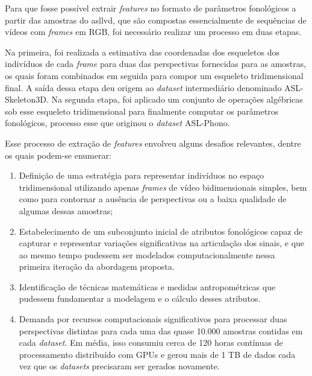 Para que fosse possível extrair \textit{features} no formato de parâmetros fonológicos a partir das amostras do \acrshort{asllvd}, que são compostas essencialmente de sequências de vídeos com \textit{frames} em RGB, foi necessário realizar um processo em duas etapas.

Na primeira, foi realizada a estimativa das coordenadas dos esqueletos dos indivíduos de cada \textit{frame} para duas das perspectivas fornecidas para as amostras, os quais foram combinados em seguida para compor um esqueleto tridimensional final. A saída dessa etapa deu origem ao \textit{dataset} intermediário denominado ASL-Skeleton3D.
Na segunda etapa, foi aplicado um conjunto de operações algébricas sob esse esqueleto tridimensional para finalmente computar os parâmetros fonológicos, processo esse que originou o \textit{dataset} ASL-Phono.


Esse processo de extração de \textit{features} envolveu alguns desafios relevantes, dentre os quais podem-se enumerar:

\begin{enumerate}
    \item Definição de uma estratégia para representar indivíduos no espaço tridimensional utilizando apenas \textit{frames} de vídeo bidimensionais simples, bem como para contornar a ausência de perspectivas ou a baixa qualidade de algumas dessas amostras;

    \item Estabelecimento de um subconjunto inicial de atributos fonológicos capaz de capturar e representar variações significativas na articulação dos sinais, e que ao mesmo tempo pudessem ser modelados computacionalmente nessa primeira iteração da abordagem proposta.

    \item Identificação de técnicas matemáticas e medidas antropométricas que pudessem fundamentar a modelagem e o cálculo desses atributos.

    \item Demanda por recursos computacionais significativos para processar duas perspectivas distintas para cada uma das quase 10.000 amostras contidas em cada \textit{dataset}. Em média, isso consumiu cerca de 120 horas contínuas de processamento distribuído com GPUs e gerou mais de 1 TB de dados cada vez que os \textit{datasets} precisaram ser gerados novamente.
\end{enumerate}





